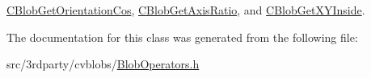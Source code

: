 \hyperlink{class_c_blob_get_orientation_cos_ae5701293031dde73229d7515ad41e3bb}{CBlobGetOrientationCos}, \hyperlink{class_c_blob_get_axis_ratio_a8b9deb499fb1c850d92f73e34091469a}{CBlobGetAxisRatio}, and \hyperlink{class_c_blob_get_x_y_inside_a5f816b668c59d6f782bea83076ccf96e}{CBlobGetXYInside}.



The documentation for this class was generated from the following file:\begin{DoxyCompactItemize}
\item 
src/3rdparty/cvblobs/\hyperlink{_blob_operators_8h}{BlobOperators.h}\end{DoxyCompactItemize}
